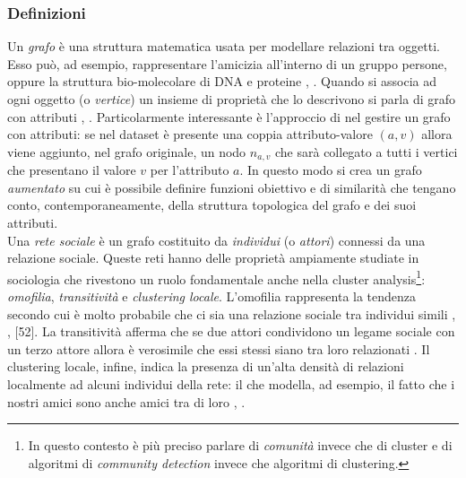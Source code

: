 \subsubsection{Definizioni}
Un \textit{grafo} \`e una struttura matematica usata per modellare relazioni tra oggetti. Esso pu\`o, ad esempio, rappresentare l'amicizia all'interno di un gruppo persone, oppure la struttura bio-molecolare di DNA e proteine \cite{Trudeau1994}, \cite{Mason07}. Quando si associa ad ogni oggetto (o \textit{vertice}) un insieme di propriet\`a che lo descrivono si parla di grafo con attributi  \cite{inc_cluster}, \cite{bagc}. Particolarmente interessante \`e l'approccio di \cite{inc_cluster} nel gestire un grafo con attributi: se nel dataset \`e presente una coppia attributo-valore $ (a, v) $ allora viene aggiunto, nel grafo originale, un nodo $ n_{a,v} $ che sar\`a collegato a tutti i vertici che presentano il valore $ v $ per l'attributo $ a $. In questo modo si crea un grafo \textit{aumentato} su cui \`e possibile definire funzioni obiettivo e di similarit\`a che tengano conto, contemporaneamente, della struttura topologica del grafo e dei suoi attributi.\\
Una \textit{rete sociale} \`e un grafo costituito da \textit{individui} (o \textit{attori}) connessi da una relazione sociale. Queste reti hanno delle propriet\`a ampiamente studiate in sociologia che rivestono un ruolo fondamentale anche nella cluster analysis\footnote{In questo contesto \`e pi\`u preciso parlare di \textit{comunit\`a} invece che di cluster e di algoritmi di \textit{community detection} invece che algoritmi di clustering.}: \textit{omofilia}, \textit{transitivit\`a} e \textit{clustering locale}. L'omofilia rappresenta la tendenza secondo cui \`e molto probabile che ci sia una relazione sociale tra individui simili \cite{mcpherson2001}, \cite{lazarsfeld1954}, [52]. La transitivit\`a afferma che se due attori condividono un legame sociale con un terzo attore allora \`e verosimile che essi stessi siano tra loro relazionati \cite{white1976}. Il clustering locale, infine, indica la presenza di un'alta densit\`a di relazioni localmente ad alcuni individui della rete: il che modella, ad esempio, il fatto che i nostri amici sono anche amici tra di loro \cite{Watts1998}, \cite{Newman2003}.

